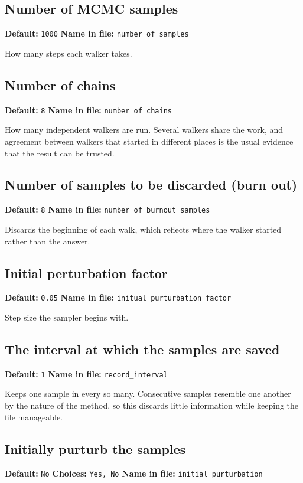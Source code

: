 \documentclass[11pt]{article}
\begin{document}
\subsection{Number of MCMC samples}
{\small \textbf{Default:} \texttt{1000} \quad\textbullet\quad \textbf{Name in file:} \texttt{number\_\allowbreak{}of\_\allowbreak{}samples}}

How many steps each walker takes.
\subsection{Number of chains}
{\small \textbf{Default:} \texttt{8} \quad\textbullet\quad \textbf{Name in file:} \texttt{number\_\allowbreak{}of\_\allowbreak{}chains}}

How many independent walkers are run. Several walkers share the work, and agreement between walkers that started in different places is the usual evidence that the result can be trusted.
\subsection{Number of samples to be discarded (burn out)}
{\small \textbf{Default:} \texttt{8} \quad\textbullet\quad \textbf{Name in file:} \texttt{number\_\allowbreak{}of\_\allowbreak{}burnout\_\allowbreak{}samples}}

Discards the beginning of each walk, which reflects where the walker started rather than the answer.
\subsection{Initial perturbation factor}
{\small \textbf{Default:} \texttt{0.\allowbreak{}05} \quad\textbullet\quad \textbf{Name in file:} \texttt{initual\_\allowbreak{}purturbation\_\allowbreak{}factor}}

Step size the sampler begins with.
\subsection{The interval at which the samples are saved}
{\small \textbf{Default:} \texttt{1} \quad\textbullet\quad \textbf{Name in file:} \texttt{record\_\allowbreak{}interval}}

Keeps one sample in every so many. Consecutive samples resemble one another by the nature of the method, so this discards little information while keeping the file manageable.
\subsection{Initially purturb the samples}
{\small \textbf{Default:} \texttt{No} \quad\textbullet\quad \textbf{Choices:} \texttt{Yes, No} \quad\textbullet\quad \textbf{Name in file:} \texttt{initial\_\allowbreak{}purturbation}}
\end{document}
